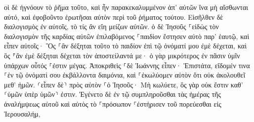 \documentclass{openreader}
\begin{document}
οἱ δὲ ἠγνόουν τὸ ῥῆμα τοῦτο, καὶ ἦν παρακεκαλυμμένον ἀπ’ αὐτῶν ἵνα μὴ αἴσθωνται αὐτό, καὶ ἐφοβοῦντο ἐρωτῆσαι αὐτὸν περὶ τοῦ ῥήματος τούτου. 
Εἰσῆλθεν δὲ διαλογισμὸς ἐν αὐτοῖς, τὸ τίς ἂν εἴη μείζων αὐτῶν. 
ὁ δὲ Ἰησοῦς ⸀εἰδὼς τὸν διαλογισμὸν τῆς καρδίας αὐτῶν ἐπιλαβόμενος ⸀παιδίον ἔστησεν αὐτὸ παρ’ ἑαυτῷ, 
καὶ εἶπεν αὐτοῖς· Ὃς ⸀ἂν δέξηται τοῦτο τὸ παιδίον ἐπὶ τῷ ὀνόματί μου ἐμὲ δέχεται, καὶ ὃς ⸁ἂν ἐμὲ δέξηται δέχεται τὸν ἀποστείλαντά με· ὁ γὰρ μικρότερος ἐν πᾶσιν ὑμῖν ὑπάρχων οὗτός ⸀ἐστιν μέγας. 
Ἀποκριθεὶς ⸀δὲ Ἰωάννης εἶπεν· Ἐπιστάτα, εἴδομέν τινα ⸀ἐν τῷ ὀνόματί σου ἐκβάλλοντα δαιμόνια, καὶ ⸀ἐκωλύομεν αὐτὸν ὅτι οὐκ ἀκολουθεῖ μεθ’ ἡμῶν. 
⸂εἶπεν δὲ⸃ πρὸς αὐτὸν ⸀ὁ Ἰησοῦς· Μὴ κωλύετε, ὃς γὰρ οὐκ ἔστιν καθ’ ⸂ὑμῶν ὑπὲρ ὑμῶν⸃ ἐστιν. 
Ἐγένετο δὲ ἐν τῷ συμπληροῦσθαι τὰς ἡμέρας τῆς ἀναλήμψεως αὐτοῦ καὶ αὐτὸς τὸ ⸀πρόσωπον ⸀ἐστήρισεν τοῦ πορεύεσθαι εἰς Ἰερουσαλήμ, 
\end{document}
